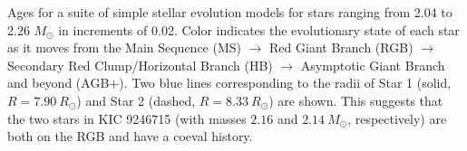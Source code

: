 \label{fig:mesa} Ages for a suite of simple stellar evolution models for stars ranging from 2.04 to 2.26 $M_{\odot}$ in increments of 0.02. Color indicates the evolutionary state of each star as it moves from the Main Sequence (MS) $\rightarrow$ Red Giant Branch (RGB) $\rightarrow$ Secondary Red Clump/Horizontal Branch (HB) $\rightarrow$ Asymptotic Giant Branch and beyond (AGB+). Two blue lines corresponding to the radii of Star 1 (solid, $R = 7.90 \ R_\odot$) and Star 2 (dashed, $R = 8.33 \ R_\odot$) are shown. This suggests that the two stars in KIC 9246715 (with masses $2.16$ and $2.14 \ M_\odot$, respectively) are both on the RGB and have a coeval history.
  
  
  
  
  